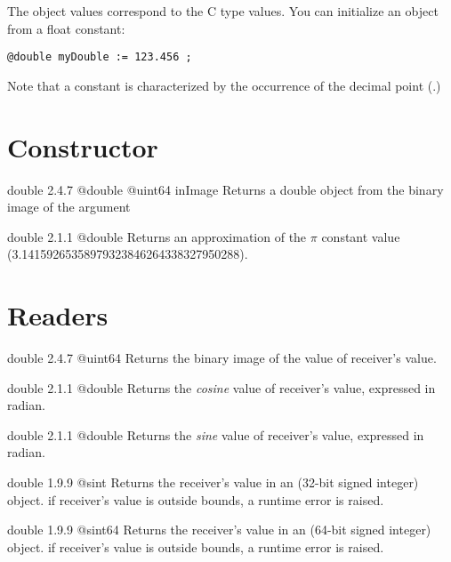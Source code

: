 

The  object values correspond to the C type  values. You can initialize an  object from a float constant:

\texttt{@double myDouble := 123.456 ;}

Note that a  constant is characterized by the occurrence of the decimal point (.)

\section{Constructor}

{double}
{2.4.7}
{@double}
{@uint64 inImage}
{Returns a double object from the binary image of the argument}
{}

{double}
{2.1.1}
{@double}
{Returns an approximation of the $\pi$ constant value (3.14159265358979323846264338327950288).}
{}

\section{Readers}

{double}
{2.4.7}
{@uint64}
{Returns the binary image of the value of receiver's value.}
{}




{double}
{2.1.1}
{@double}
{Returns the \emph{cosine} value of receiver's value, expressed in radian.}
{}




{double}
{2.1.1}
{@double}
{Returns the \emph{sine} value of receiver's value, expressed in radian.}
{}




{double}
{1.9.9}
{@sint}
{Returns the receiver's value in an  (32-bit signed integer) object.}
{if receiver's value is outside  bounds, a runtime error is raised.}



{double}
{1.9.9}
{@sint64}
{Returns the receiver's value in an  (64-bit signed integer) object.}
{if receiver's value is outside  bounds, a runtime error is raised.}




